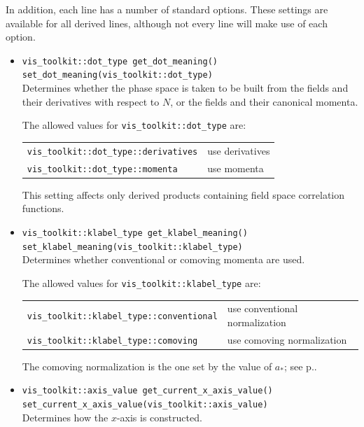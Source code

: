 \documentclass[11pt,a4paper]{article}
\newcommand{\astar}{a_{\ast}}
\begin{document}
In addition, each line has a number of standard options. These settings are available
for all derived lines, although not every line will make use of each option.
\begin{itemize}
    \item \texttt{vis_toolkit::dot_type get_dot_meaning()} \\
    \texttt{set_dot_meaning(vis_toolkit::dot_type)} \\
    Determines whether the phase space is taken to be built from the
    fields and their derivatives with respect to $N$, or the fields
    and their canonical momenta.
    
    The allowed values for \texttt{vis_toolkit::dot_type} are: \\
    \begin{tabular}{p{6.5cm}p{7cm}}
        \texttt{vis_toolkit::dot_type::derivatives} &
            use derivatives \\
        \texttt{vis_toolkit::dot_type::momenta} &
            use momenta    
    \end{tabular}

    This setting affects only derived products containing
    field space correlation functions.
    
    \item \texttt{vis_toolkit::klabel_type get_klabel_meaning()} \\
    \texttt{set_klabel_meaning(vis_toolkit::klabel_type)} \\
    Determines whether conventional or comoving momenta are used.
    
    The allowed values for \texttt{vis_toolkit::klabel_type} are: \\
    \begin{tabular}{p{6.5cm}p{7.5cm}}
        \texttt{vis_toolkit::klabel_type::conventional} &
            use conventional normalization \\
        \texttt{vis_toolkit::klabel_type::comoving} &
            use comoving normalization 
    \end{tabular}

    The comoving normalization is the one set by the value of
    $\astar$; see p.\pageref{method:set_astar_normalization}.
    
    \item \texttt{vis_toolkit::axis_value get_current_x_axis_value()} \\
    \texttt{set_current_x_axis_value(vis_toolkit::axis_value)} \\
    Determines how the $x$-axis is constructed.
    

\end{itemize}
\end{document}
